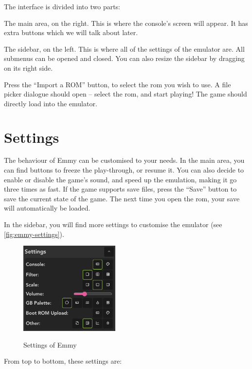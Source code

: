 The interface is divided into two parts:

\begin{compactitem}
	\item The main area, on the right. This is where the console's screen will appear. It has extra buttons which we will talk about later.
	\item The sidebar, on the left. This is where all of the settings of the emulator are. All submenus can be opened and closed. You can also resize the sidebar by dragging on its right side.
\end{compactitem}


Press the ``Import a ROM'' button, to select the \gls{rom} you wish to use. A file picker dialogue should open -- select the \gls{rom}, and start playing! The game should directly load into the emulator.

\section{Settings}

The behaviour of Emmy can be customised to your needs. In the main area, you can find buttons to freeze the play-through, or resume it. You can also decide to enable or disable the game's sound, and speed up the emulation, making it go three times as fast. If the game supports save files, press the ``Save'' button to save the current state of the game. The next time you open the \gls{rom}, your save will automatically be loaded.

In the sidebar, you will find more settings to customise the emulator (see \autoref{fig:emmy-settings}).

\begin{figure}[h]
    \centering
    \includegraphics[width=5cm]{images/emmy-settings}\\
    \caption{Settings of Emmy}
    \label{fig:emmy-settings}
\end{figure}

From top to bottom, these settings are:

